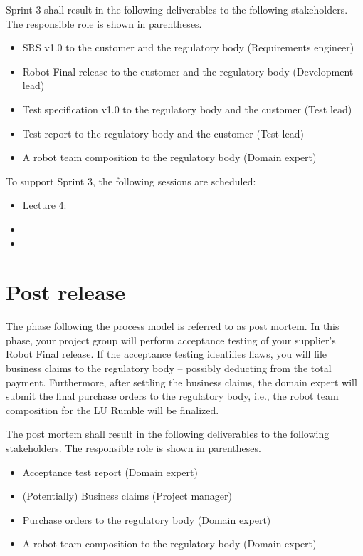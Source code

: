\documentclass{scrreprt}
\begin{document}
Sprint 3 shall result in the following deliverables to the following stakeholders. The responsible role is shown in parentheses.
\begin{itemize}
\item SRS v1.0 to the customer and the regulatory body (Requirements engineer)
\item Robot Final release to the customer and the regulatory body (Development lead)
\item Test specification v1.0 to the regulatory body and the customer (Test lead)
\item Test report to the regulatory body and the customer (Test lead)
\item A robot team composition to the regulatory body (Domain expert)
\end{itemize}

To support Sprint 3, the following sessions are scheduled:
\begin{itemize}
\item Lecture 4:
\item 
\item 
\end{itemize}

\section{Post release}
The phase following the process model is referred to as post mortem. In this phase, your project group will perform acceptance testing of your supplier's Robot Final release. If the acceptance testing identifies flaws, you will file business claims to the regulatory body -- possibly deducting from the total payment. Furthermore, after settling the business claims, the domain expert will submit the final purchase orders to the regulatory body, i.e., the robot team composition for the LU Rumble will be finalized.

The post mortem shall result in the following deliverables to the following stakeholders. The responsible role is shown in parentheses.
\begin{itemize}
\item Acceptance test report (Domain expert)
\item (Potentially) Business claims (Project manager)
\item Purchase orders to the regulatory body (Domain expert)
\item A robot team composition to the regulatory body (Domain expert)
\end{itemize}
\end{document}
